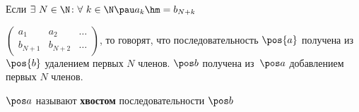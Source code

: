 
        Если $\exists\  N\in\N\colon \forall\  k\in\N\pau a_k\hm=b_{N+k}$

        $\begin{pmatrix}
            a_1&a_2&\ldots\\
            b_{N+1}&b_{N+2}&\ldots
        \end{pmatrix}$, то говорят, что последовательность $\pos{a}$ получена из~$\pos{b}$ удалением первых $N$ членов. $\pos b$ получена из~$\pos a$ добавлением первых $N$ членов.

        $\pos a$ называют \textbf{хвостом} последовательности $\pos b$
    